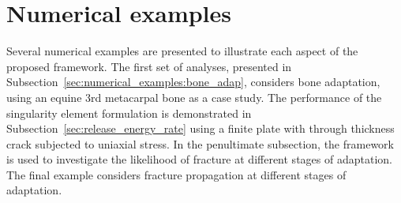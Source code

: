 \documentclass[twocolumn]{svjour3}
\begin{document}

\section{Numerical examples}
\label{sec:numerical_examples}
Several numerical examples are presented to illustrate each aspect of the proposed framework. 
The first set of analyses, presented in Subsection~\ref{sec:numerical_examples:bone_adap}, considers bone adaptation, using an equine 3rd metacarpal bone as a case study.
The performance of the singularity element formulation is demonstrated in Subsection~\ref{sec:release_energy_rate} using a finite plate with through thickness crack subjected to uniaxial stress. In the penultimate subsection, the framework is used to investigate the likelihood of fracture at different  stages of adaptation. The final example considers fracture propagation at different stages of adaptation.
\end{document}
